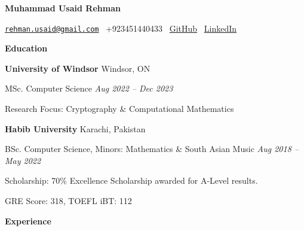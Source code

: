 \documentclass[12pt, a4paper]{article}
\begin{document}
{}\selectfont

\begin{center}
    \Large\textbf{Muhammad Usaid Rehman}\\ 
    \hrulefill
\end{center}

\begin{center}
    \href{mailto:rehman.usaid@gmail.com}{\texttt{rehman.usaid@gmail.com}} \textbullet \ +923451440433 \textbullet \ \href{https://github.com/m-usaid99}{GitHub} \textbullet \ \href{https://www.linkedin.com/in/muhammad-usaid-rehman-aa8b64202/}{LinkedIn}
\end{center}

\begin{center}
    \large\textbf{Education}
\end{center}

\textbf{University of Windsor} \hfill Windsor, ON

MSc. Computer Science \hfill \textit{Aug 2022 -- Dec 2023}

Research Focus: Cryptography \& Computational Mathematics



\vspace{12pt}
\textbf{Habib University} \hfill Karachi, Pakistan

BSc. Computer Science, Minors: Mathematics \& South Asian Music \hfill \textit{Aug 2018 -- May 2022}

Scholarship: 70\% Excellence Scholarship awarded for A-Level results.


GRE Score: 318, TOEFL iBT: 112






\begin{center}
    \large\textbf{Experience}
\end{center}
\end{document}
